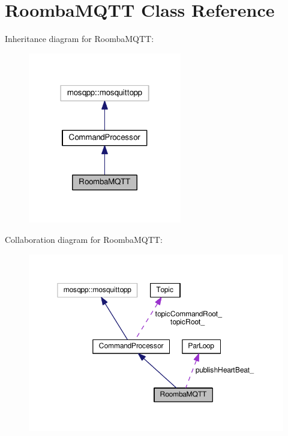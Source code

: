 \hypertarget{class_roomba_m_q_t_t}{}\section{Roomba\+M\+Q\+TT Class Reference}
\label{class_roomba_m_q_t_t}


Inheritance diagram for Roomba\+M\+Q\+TT\+:\nopagebreak
\begin{figure}[H]
\begin{center}
\leavevmode
\includegraphics[width=190pt]{class_roomba_m_q_t_t__inherit__graph}
\end{center}
\end{figure}


Collaboration diagram for Roomba\+M\+Q\+TT\+:\nopagebreak
\begin{figure}[H]
\begin{center}
\leavevmode
\includegraphics[width=350pt]{class_roomba_m_q_t_t__coll__graph}
\end{center}
\end{figure}
